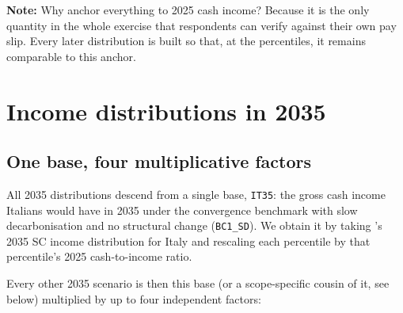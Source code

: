 \documentclass[12pt,a4paper]{article}
\newcommand{\note}[1]{%
  \begin{center}
    \colorbox{yellow!30}{\parbox{0.9\linewidth}{\textbf{Note:} #1}}
  \end{center}}
\newcommand{\scenario}[1]{\texttt{#1}}
\newcommand{\col}[1]{\texttt{#1}}
\begin{document}
\note{%
  Why anchor everything to 2025 cash income? Because it is the only quantity in the whole exercise that respondents can verify against their own pay slip. Every later distribution is built so that, at the percentiles, it remains comparable to this anchor.
}

\section{Income distributions in 2035}
\label{sec:it2035}

\subsection{One base, four multiplicative factors}
\label{sec:factors}

All 2035 distributions descend from a single base, \col{IT35}: the gross cash income Italians would have in 2035 under the convergence benchmark with slow decarbonisation and no structural change (\scenario{BC1\_SD}). We obtain it by taking \citet{Bothe2026}'s 2035 SC income distribution for Italy and rescaling each percentile by that percentile's 2025 cash-to-income ratio. %

Every other 2035 scenario is then this base (or a scope-specific cousin of it, see below) multiplied by up to four independent factors:
\end{document}
